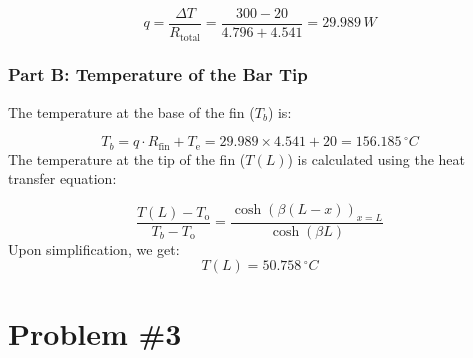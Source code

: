 \documentclass{article}
\numberwithin{equation}{section}
\begin{document}
\begin{equation}
q = \frac{\Delta T}{R_{\text{total}}} = \frac{300 - 20}{4.796 + 4.541} = 29.989 \, W
\end{equation}

\subsubsection*{Part B: Temperature of the Bar Tip}
\noindent
The temperature at the base of the fin ($T_b$) is:

\begin{equation}
T_b = q \cdot R_{\text{fin}} + T_{\text{e}} = 29.989 \times 4.541 + 20 = 156.185 \, ^\circ C
\end{equation}
\noindent
The temperature at the tip of the fin ($T(L)$) is calculated using the heat transfer equation:

\begin{equation}
\frac{T(L) - T_{\text{o}}}{T_b - T_{\text{o}}} = \frac{\cosh(\beta (L - x))_{x=L}}{\cosh(\beta L)}
\end{equation}
\noindent
Upon simplification, we get:
\begin{equation}
T(L) = 50.758 \, ^\circ C
\end{equation}

\newpage
\section{Problem \#3}
\end{document}

